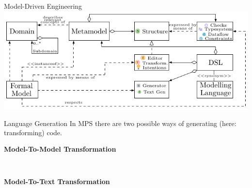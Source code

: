 	\begin{frame}[noframenumbering]{Model-Driven Engineering}
		\includegraphics[width=\textwidth]{tikz/mdsd_concept_8.pdf}
	\end{frame}
	
	\begin{frame}{Language Generation}
		In MPS there are two possible ways of generating (here: transforming) code.\\
		
		\begin{minipage}{0.4\textwidth}
			\textbf{Model-To-Model Transformation}
		\end{minipage} 
		\begin{minipage}{0.09\textwidth}
			\Large
			\textcolor{white}{$\Rightarrow$}
		\end{minipage}
		\begin{minipage}{0.4\textwidth}
			\textbf{Model-To-Text Transformation}
		\end{minipage}
	
		\vspace*{0.5cm}
		

\end{frame}
